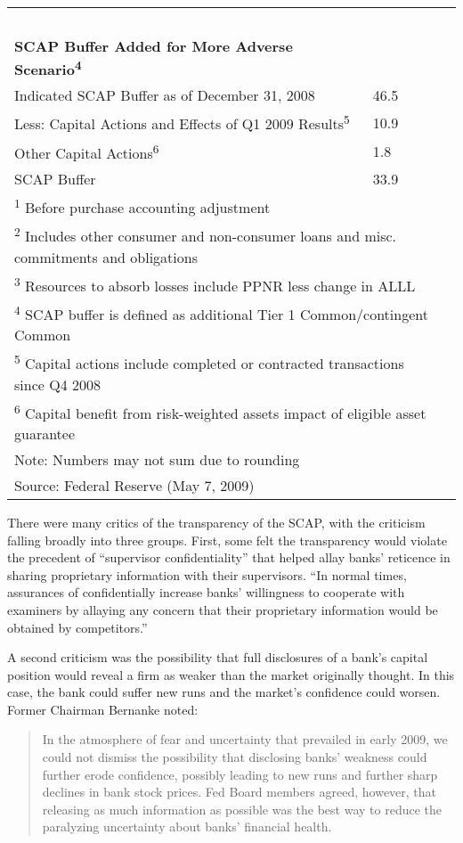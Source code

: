 \documentclass[12pt]{article}
\begin{document}
\begin{table}[htbp]
\begin{longtable}[l]{@{\extracolsep{\fill}}@{}ll@{}rl@{}}
~ & ~ & ~\tabularnewline
\textbf{SCAP Buffer Added for More Adverse Scenario\textsuperscript{4}} & ~ & ~\tabularnewline
Indicated SCAP Buffer as of December 31, 2008 & 46.5 & ~\tabularnewline
\hspace{1em} Less: Capital Actions and Effects of Q1 2009 Results\textsuperscript{5}& 10.9 & ~\tabularnewline
\hspace{2em} Other Capital Actions\textsuperscript{6}& 1.8 & ~\tabularnewline
SCAP Buffer & 33.9 &~\tabularnewline
\bottomrule
\multicolumn{3}{l}{\footnotesize\textsuperscript{1} Before purchase accounting adjustment }\tabularnewline
\multicolumn{3}{l}{\footnotesize\textsuperscript{2} Includes other consumer and non-consumer loans and misc. commitments and obligations}\tabularnewline
\multicolumn{3}{l}{\footnotesize\textsuperscript{3} Resources to absorb losses include PPNR less change in ALLL}\tabularnewline
\multicolumn{3}{l}{\footnotesize\textsuperscript{4} SCAP buffer is defined as additional Tier 1 Common/contingent Common}\tabularnewline
\multicolumn{3}{l}{\footnotesize\textsuperscript{5} Capital actions include completed or contracted transactions since Q4 2008}\tabularnewline
\multicolumn{3}{l}{\footnotesize\textsuperscript{6} Capital benefit from risk-weighted assets impact of eligible asset guarantee}\tabularnewline
\multicolumn{3}{l}{\footnotesize Note: Numbers may not sum due to rounding}\tabularnewline
\multicolumn{3}{l}{\footnotesize Source: Federal Reserve (May 7, 2009)}\tabularnewline
\end{longtable}

\end{table}

There were many critics of the transparency of the SCAP, with the criticism
falling broadly into three groups. First, some felt the transparency would
violate the precedent of ``supervisor confidentiality'' that helped allay
banks' reticence in sharing proprietary information with their
supervisors. ``In normal times, assurances of confidentially increase
banks' willingness to cooperate with examiners by allaying any concern
that their proprietary information would be obtained by competitors.''\citep{Bernanke}

A second criticism was the possibility that full disclosures of a bank's
capital position would reveal a firm as weaker than the market
originally thought. In this case, the bank could suffer new runs and the
market's confidence could worsen. Former Chairman Bernanke noted:

\begin{quote}
In the atmosphere of fear and uncertainty that prevailed in early 2009,
we could not dismiss the possibility that disclosing banks' weakness
could further erode confidence, possibly leading to new runs and further
sharp declines in bank stock prices. Fed Board members agreed, however,
that releasing as much information as possible was the best way to
reduce the paralyzing uncertainty about banks' financial health.
\citep{Bernanke}
\end{quote}
\end{document}
